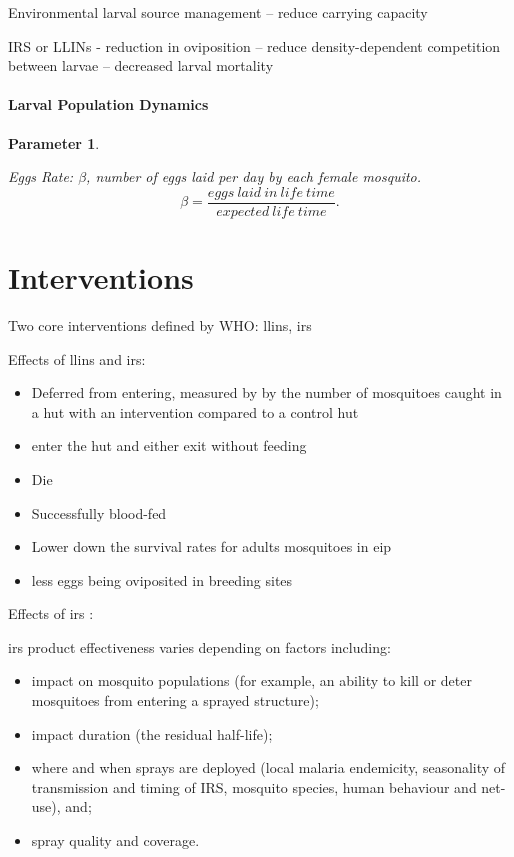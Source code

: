 \documentclass[a4paper, 12pt, twoside]{article}
\newtheorem{parameter}{Parameter}
\begin{document}
Environmental larval source management -- reduce carrying capacity

IRS or LLINs - reduction in oviposition -- reduce density-dependent competition between larvae -- decreased larval mortality

\paragraph{Larval Population Dynamics}%
\label{par:larval_population_dynamics}

\begin{parameter}
\label{para:eggs_laid_per_day}

Eggs Rate: $\beta$, number of eggs laid per day by each female mosquito.
\[
\beta=\frac{eggs\:laid\:in\:life\:time}{expected\:life\:time}
.\]

\end{parameter}

\section{Interventions}

Two core interventions defined by WHO: \gls{llins}, \gls{irs}

Effects of \gls{llins} and \gls{irs}:

\begin{itemize}
\item Deferred from entering, measured by by the number of mosquitoes caught in a hut with an intervention compared to a control hut
\item enter the hut and either exit without feeding
\item Die
\item Successfully blood-fed
\item Lower down the survival rates for adults mosquitoes in \gls{eip} 
\item less eggs being oviposited in breeding sites
\end{itemize}

Effects of \gls{irs} \cite{Sherrard-Smith2018b}:

\gls{irs} product effectiveness varies depending on factors including: 

\begin{itemize}
  \item impact on mosquito populations (for example, an ability to kill or deter mosquitoes from entering a sprayed structure); 
  \item impact duration (the residual half-life); 
  \item where and when sprays are deployed (local malaria endemicity, seasonality of transmission and timing of IRS, mosquito species, human behaviour and net-use), and; 
  \item spray quality and coverage.
\end{itemize}
\end{document}
